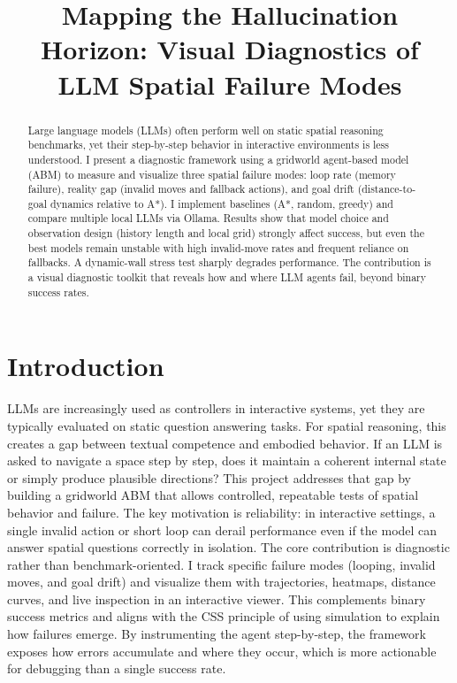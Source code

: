 \documentclass[conference]{IEEEtran}
\title{Mapping the Hallucination Horizon: Visual Diagnostics of LLM Spatial Failure Modes}
\author{\IEEEauthorblockN{Pablo Rodriguez}
\IEEEauthorblockA{Graduate Group in Computer Science\\
University of California, Davis\\
prodriguezqu@ucdavis.edu}}
\begin{document}
\maketitle

\begin{abstract}
Large language models (LLMs) often perform well on static spatial reasoning benchmarks, yet their step-by-step behavior in interactive environments is less understood. I present a diagnostic framework using a gridworld agent-based model (ABM) to measure and visualize three spatial failure modes: loop rate (memory failure), reality gap (invalid moves and fallback actions), and goal drift (distance-to-goal dynamics relative to A*). I implement baselines (A*, random, greedy) and compare multiple local LLMs via Ollama. Results show that model choice and observation design (history length and local grid) strongly affect success, but even the best models remain unstable with high invalid-move rates and frequent reliance on fallbacks. A dynamic-wall stress test sharply degrades performance. The contribution is a visual diagnostic toolkit that reveals how and where LLM agents fail, beyond binary success rates.
\end{abstract}

\section{Introduction}
LLMs are increasingly used as controllers in interactive systems, yet they are typically evaluated on static question answering tasks. For spatial reasoning, this creates a gap between textual competence and embodied behavior. If an LLM is asked to navigate a space step by step, does it maintain a coherent internal state or simply produce plausible directions? This project addresses that gap by building a gridworld ABM that allows controlled, repeatable tests of spatial behavior and failure. The key motivation is reliability: in interactive settings, a single invalid action or short loop can derail performance even if the model can answer spatial questions correctly in isolation.
The core contribution is diagnostic rather than benchmark-oriented. I track specific failure modes (looping, invalid moves, and goal drift) and visualize them with trajectories, heatmaps, distance curves, and live inspection in an interactive viewer. This complements binary success metrics and aligns with the CSS principle of using simulation to explain how failures emerge. By instrumenting the agent step-by-step, the framework exposes how errors accumulate and where they occur, which is more actionable for debugging than a single success rate.
\end{document}
